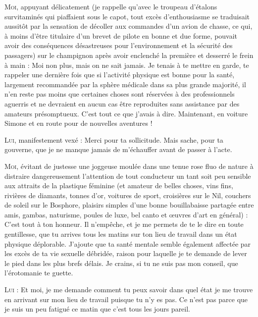 \begin{dialogue}
%
%
%
\textsc{Moi}, appuyant délicatement (je rappelle qu’avec le troupeau d’étalons survitaminés qui piaffaient sous le capot, tout excès d’enthousiasme se traduisait aussitôt par la sensation de décoller aux commandes d’un avion de chasse, ce qui, à moins d’être titulaire d’un brevet de pilote en bonne et due forme, pouvait avoir des conséquences désastreuses pour l’environnement et la sécurité des passagers) sur le champignon après avoir enclenché la première et desserré le frein à main : Moi non plus, mais on ne sait jamais. Je tenais à te mettre en garde, te rappeler une dernière fois que si l’activité physique est bonne pour la santé, largement recommandée par la sphère médicale dans sa plus grande majorité, il n’en reste pas moins que certaines choses sont réservées à des professionnels aguerris et ne devraient en aucun cas être reproduites sans assistance par des amateurs présomptueux. C’est tout ce que j’avais à dire. Maintenant, en voiture Simone et en route pour de nouvelles aventures !

\textsc{Lui}, manifestement vexé : Merci pour ta sollicitude. Mais sache, pour ta gouverne, que je ne manque jamais de m’échauffer avant de passer à l’acte.

\textsc{Moi}, évitant de justesse une joggeuse moulée dans une tenue rose fluo de nature à distraire dangereusement l’attention de tout conducteur un tant soit peu sensible aux attraits de la plastique féminine (et amateur de belles choses, vins fins, rivières de diamants, tonnes d’or, voitures de sport, croisières sur le Nil, couchers de soleil sur le Bosphore, plaisirs simples d’une bonne bouillabaisse partagée entre amis, gambas, naturisme, poules de luxe, bel canto et œuvres d’art en général) : C’est tout à ton honneur. Il n’empêche, et je me permets de te le dire en toute gentillesse, que tu arrives tous les matins sur ton lieu de travail dans un état physique déplorable. J’ajoute que ta santé mentale semble également affectée par les excès de ta vie sexuelle débridée, raison pour laquelle je te demande de lever le pied dans les plus brefs délais. Je crains, si tu ne suis pas mon conseil, que l’érotomanie te guette.

%
%
%
\textsc{Lui} : Et moi, je me demande comment tu peux savoir dans quel état je me trouve en arrivant sur mon lieu de travail puisque tu n’y es pas. Ce n’est pas parce que je suis un peu fatigué ce matin que c’est tous les jours pareil.


\end{dialogue}
